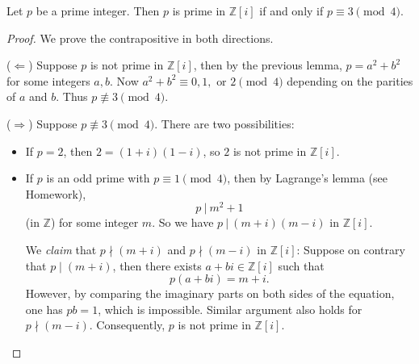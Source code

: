 \begin{theorem}
Let $p$ be a prime integer. Then $p$ is prime in $\mathbb{Z}[i]$ if and only if $p \equiv 3 \pmod{4}$.
\end{theorem}

\begin{proof}
We prove the contrapositive in both directions.


($\Leftarrow$) Suppose $p$ is not prime in $\mathbb{Z}[i]$, then by the previous lemma, $p = a^2 + b^2$ for some integers $a, b$. Now $a^2 + b^2 \equiv 0, 1, \text{ or } 2 \pmod{4}$ depending on the parities of $a$ and $b$. Thus $p \not\equiv 3 \pmod{4}$.

($\Rightarrow$) Suppose $p \not\equiv 3 \pmod{4}$. There are two possibilities:
\begin{itemize}
    \item If $p = 2$, then $2 = (1+i)(1-i)$, so $2$ is not prime in $\mathbb{Z}[i]$.
    \item If $p$ is an odd prime with $p \equiv 1 \pmod{4}$, then by Lagrange's lemma (see Homework), 
    $$p \ |\ m^2 + 1$$
    (in $\mathbb{Z}$) for some integer $m$. So we have $p\ |\ (m+i)(m-i)$ in $\mathbb{Z}[i]$.

    We {\it claim} that $p \nmid (m+i)$ and $p \nmid (m-i)$ in $\mathbb{Z}[i]$: Suppose on contrary that $p \mid (m+i)$, then there exists $a + bi \in \mathbb{Z}[i]$ such that
    $$p(a+bi) = m+i.$$
    However, by comparing the imaginary parts on both sides of the equation, one has $pb = 1$, which is impossible. Similar argument also holds for $p \nmid (m-i)$. Consequently, $p$ is not prime in $\mathbb{Z}[i]$.
\end{itemize}
 
\end{proof}

